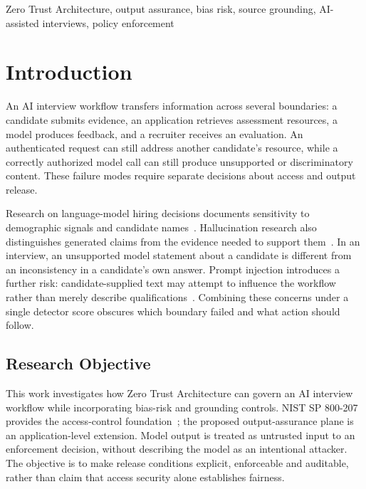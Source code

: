 \documentclass[conference]{IEEEtran}
\begin{document}
\begin{IEEEkeywords}
Zero Trust Architecture, output assurance, bias risk, source grounding, AI-assisted interviews, policy enforcement

\end{IEEEkeywords}

\section{Introduction}

An AI interview workflow transfers information across several boundaries: a candidate submits evidence, an application retrieves assessment resources, a model produces feedback, and a recruiter receives an evaluation. An authenticated request can still address another candidate's resource, while a correctly authorized model call can still produce unsupported or discriminatory content. These failure modes require separate decisions about access and output release.

Research on language-model hiring decisions documents sensitivity to demographic signals and candidate names~\cite{an2024discriminate,nghiem2024name}. Hallucination research also distinguishes generated claims from the evidence needed to support them~\cite{zhang2025sirens}. In an interview, an unsupported model statement about a candidate is different from an inconsistency in a candidate's own answer. Prompt injection introduces a further risk: candidate-supplied text may attempt to influence the workflow rather than merely describe qualifications~\cite{baxi2026prompt}. Combining these concerns under a single detector score obscures which boundary failed and what action should follow.

\subsection{Research Objective}

This work investigates how Zero Trust Architecture can govern an AI interview workflow while incorporating bias-risk and grounding controls. NIST SP 800-207 provides the access-control foundation~\cite{rose2020zero}; the proposed output-assurance plane is an application-level extension. Model output is treated as untrusted input to an enforcement decision, without describing the model as an intentional attacker. The objective is to make release conditions explicit, enforceable and auditable, rather than claim that access security alone establishes fairness.
\end{document}
